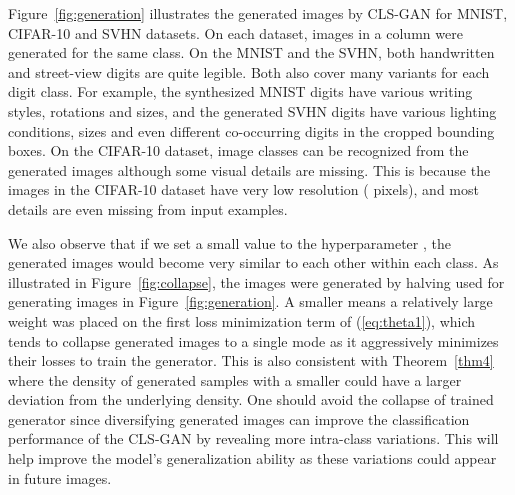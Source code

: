 \documentclass[11pt,fullpage, letterpaper,twoside]{article}
\newcommand{\1}[1]{\mathds{1}_{\left[#1\right]}}
\begin{document}
Figure~\ref{fig:generation} illustrates the generated images by CLS-GAN for MNIST, CIFAR-10 and SVHN datasets. On each dataset, images in a column were generated for the same class. On the MNIST and the SVHN, both handwritten and street-view digits are quite legible. Both also cover many variants for each digit class. For example, the synthesized MNIST digits have various writing styles, rotations and sizes, and the generated SVHN digits have various lighting conditions, sizes and even different co-occurring digits in the cropped bounding boxes.  On the CIFAR-10 dataset, image classes can be recognized from the generated images although some visual details are missing. This is because the images in the CIFAR-10 dataset have very low resolution ( pixels), and most details are even missing from input examples.

We also observe that if we set a small value to the hyperparameter , the generated images would become very similar to each other within each class. As illustrated in Figure~\ref{fig:collapse}, the images were generated by halving  used for generating images in Figure~\ref{fig:generation}.
A smaller  means a relatively large weight was placed on the first loss minimization term of (\ref{eq:theta1}), which tends to collapse generated images to a single mode as it aggressively minimizes their losses to train the generator. This is also consistent with Theorem~\ref{thm4} where the density of generated samples with a smaller  could have a larger deviation from the underlying density.
One should avoid the collapse of trained generator since
diversifying generated images can improve the classification performance of the CLS-GAN by revealing more intra-class variations.  This will help improve the model's generalization ability as these variations could appear in future images.


\begin{figure*}[t]
\centering
{}\hspace{4mm}
\hspace{4mm}
\caption{Illustration of generated images that are collapsed to a single mode of the underlying image density on MNIST, CIFAR-10 and SVHN.}\label{fig:collapse}
\end{figure*}
\end{document}
